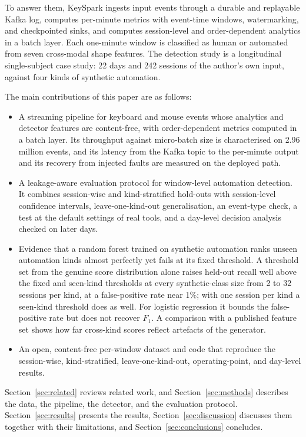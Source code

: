 \documentclass[sensors,article,submit,pdftex,oneauthor]{Definitions/mdpi}
\begin{document}
To answer them, KeySpark ingests input events through a durable and replayable Kafka log, computes per-minute metrics with event-time windows, watermarking, and checkpointed sinks, and computes session-level and order-dependent analytics in a batch layer. Each one-minute window is classified as human or automated from seven cross-modal shape features. The detection study is a longitudinal single-subject case study: 22 days and 242 sessions of the author's own input, against four kinds of synthetic automation.

The main contributions of this paper are as follows:
\begin{itemize}
\item A streaming pipeline for keyboard and mouse events whose analytics and detector features are content-free, with order-dependent metrics computed in a batch layer. Its throughput against micro-batch size is characterised on 2.96 million events, and its latency from the Kafka topic to the per-minute output and its recovery from injected faults are measured on the deployed path.
\item A leakage-aware evaluation protocol for window-level automation detection. It combines session-wise and kind-stratified hold-outs with session-level confidence intervals, leave-one-kind-out generalisation, an event-type check, a test at the default settings of real tools, and a day-level decision analysis checked on later days.
\item Evidence that a random forest trained on synthetic automation ranks unseen automation kinds almost perfectly yet fails at its fixed threshold. A threshold set from the genuine score distribution alone raises held-out recall well above the fixed and seen-kind thresholds at every synthetic-class size from 2 to 32 sessions per kind, at a false-positive rate near 1\%; with one session per kind a seen-kind threshold does as well. For logistic regression it bounds the false-positive rate but does not recover $F_1$. A comparison with a published feature set shows how far cross-kind scores reflect artefacts of the generator.
\item An open, content-free per-window dataset and code that reproduce the session-wise, kind-stratified, leave-one-kind-out, operating-point, and day-level results.
\end{itemize}

Section~\ref{sec:related} reviews related work, and Section~\ref{sec:methods} describes the data, the pipeline, the detector, and the evaluation protocol. Section~\ref{sec:results} presents the results, Section~\ref{sec:discussion} discusses them together with their limitations, and Section~\ref{sec:conclusions} concludes.
\end{document}
